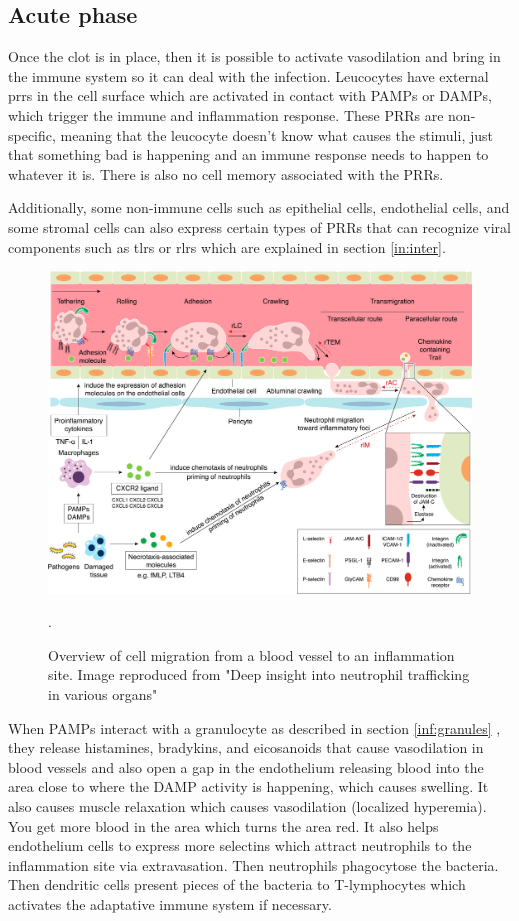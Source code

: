 \subsection{Acute phase}

Once the clot is in place, then it is possible to activate vasodilation and bring in the immune system so it can deal with the infection. Leucocytes have external \gls{prrs} in the cell surface which are activated in contact with PAMPs or DAMPs, which trigger the immune and inflammation response. These PRRs are non-specific, meaning that the leucocyte doesn't know what causes the stimuli, just that something bad is happening and an immune response needs to happen to whatever it is. There is also no cell memory associated with the PRRs.

Additionally, some non-immune cells such as epithelial cells, endothelial cells, and some stromal cells can also express certain types of PRRs that can recognize viral components such as \gls{tlrs} or \gls{rlrs} which are explained in section \ref{in:inter}.

    \begin{figure}[h!]
        \centering
            \includegraphics[width=0.8\linewidth]{figures/Inflammation/jlb0617-fig-0002-m.jpg} 
        \caption{Overview of cell migration from a blood vessel to an inflammation site. Image reproduced from "Deep insight into neutrophil trafficking in various organs" \cite{Hyun2017}}.
        \label{figure:inflammationStarts}
    \end{figure}  

When PAMPs interact with a granulocyte as described in section \ref{inf:granules} , they release histamines, bradykins, and eicosanoids that cause vasodilation in blood vessels and also open a gap in the endothelium releasing blood into the area close to where the DAMP activity is happening, which causes swelling. It also causes muscle relaxation which causes vasodilation (localized hyperemia). You get more blood in the area which turns the area red. It also helps endothelium cells to express more selectins which attract neutrophils to the inflammation site via extravasation. Then neutrophils phagocytose the bacteria. Then dendritic cells present pieces of the bacteria to T-lymphocytes which activates the adaptative immune system if necessary. 

